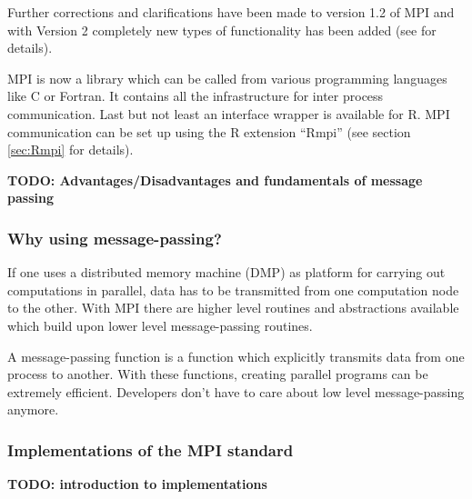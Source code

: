 Further corrections and clarifications have been made to version 1.2 of
MPI and with Version 2 completely new types of functionality has been
added (see \cite{forum94:MPI-2} for details).

MPI is now a library which can be called from various programming
languages like C or Fortran. It contains all the infrastructure for
inter process communication. Last but not least an interface wrapper
is available for R. MPI communication can be set up using the R extension
``Rmpi'' (see section \ref{sec:Rmpi} for details).

\textbf{TODO: Advantages/Disadvantages and fundamentals of message passing}

\subsubsection{Why using message-passing?}
\label{sec:why_m-p}

If one uses a distributed memory machine (DMP) as platform for
carrying out computations in parallel, data has to be transmitted from
one computation node to the other. With MPI there are higher level
routines and abstractions available which build upon lower level
message-passing routines.
  
A message-passing function is a function which explicitly transmits
data from one process to another. With these
functions, creating parallel programs can be extremely
efficient. Developers don't have to care about low level
message-passing anymore.

\subsubsection{Implementations of the MPI standard}

\textbf{TODO: introduction to implementations}


